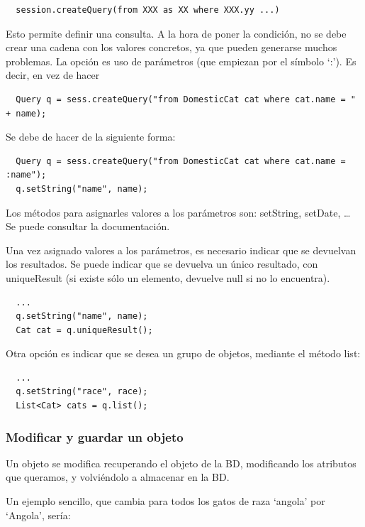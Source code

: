\documentclass[11pt]{article}
\begin{document}
\begin{lstlisting}
  session.createQuery(from XXX as XX where XXX.yy ...)
\end{lstlisting}

Esto permite definir una consulta. A la hora de poner la condición, no se debe 
crear una cadena con los valores concretos, ya que pueden generarse muchos
problemas. La opción es uso de parámetros (que empiezan por el símbolo `:'). Es decir, en vez de hacer

\begin{lstlisting}
  Query q = sess.createQuery("from DomesticCat cat where cat.name = " + name);
\end{lstlisting}


Se debe de hacer de la siguiente forma:

\begin{lstlisting}
  Query q = sess.createQuery("from DomesticCat cat where cat.name = :name");
  q.setString("name", name);
\end{lstlisting}


Los métodos para asignarles valores a los parámetros son: \textsf{setString},
\textsf{setDate}, \ldots{} Se puede consultar la documentación.

Una vez asignado valores a los parámetros, es necesario indicar que se devuelvan
los resultados. Se puede indicar que se devuelva un único resultado, con
uniqueResult (si existe sólo un elemento, devuelve null si no lo encuentra).

\begin{lstlisting}
  ...
  q.setString("name", name);
  Cat cat = q.uniqueResult();
\end{lstlisting}


Otra opción es indicar que se desea un grupo de objetos, mediante el método
\textsf{list}:

\begin{lstlisting}
  ...
  q.setString("race", race);
  List<Cat> cats = q.list();
\end{lstlisting}


\subsubsection{Modificar y guardar un objeto} \label{sec-6-3-2}

Un objeto se modifica recuperando el objeto de la BD, modificando los atributos
que queramos, y volviéndolo a almacenar en la BD.

Un ejemplo sencillo, que cambia para todos los gatos de raza `angola' por `Angola', sería:
\end{document}
